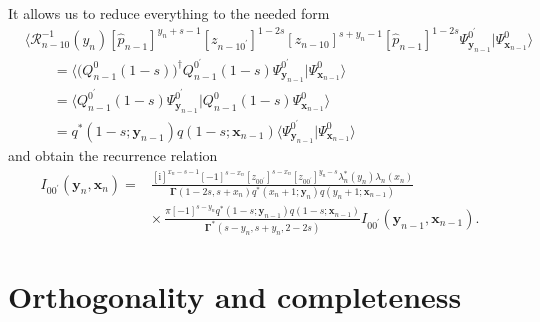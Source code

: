 \documentclass[pdftex]{sigma}
\renewcommand{\imath}{\mathrm{i}}
\numberwithin{equation}{section}
\begin{document}
It allows us to reduce everything to the needed form
\begin{align*}
&
\bigl\langle \mathcal{R}^{-1}_{n-1 0}(y_n)
[\hat{p}_{n-1}]^{y_n+s-1}
[z_{n-1 0^{\prime}}]^{1-2s} [z_{n-1 0}]^{s+y_n-1}
 [\hat{p}_{n-1}]^{1-2s} \Psi^{0^{\prime}}_{\bm{y}_{n-1}}|
\Psi^{0}_{\bm{x}_{n-1}}\bigr\rangle \\
& \qquad =
\bigl\langle
\bigl(Q^{0}_{n-1}(1-s)\bigr)^{\dagger}
Q^{0^{\prime}}_{n-1}(1-s)
 \Psi^{0^{\prime}}_{\bm{y}_{n-1}}|
\Psi^{0}_{\bm{x}_{n-1}}\bigr\rangle \\
& \qquad =
\bigl\langle
Q^{0^{\prime}}_{n-1}(1-s)
 \Psi^{0^{\prime}}_{\bm{y}_{n-1}}|
Q^{0}_{n-1}(1-s) \Psi^{0}_{\bm{x}_{n-1}}\bigr\rangle \\
& \qquad =
q^*(1-s;\bm{y}_{n-1}) q(1-s;\bm{x}_{n-1})
\bigl\langle
\Psi^{0^{\prime}}_{\bm{y}_{n-1}}|
\Psi^{0}_{\bm{x}_{n-1}}\bigr\rangle
\end{align*}
and obtain the recurrence relation
\begin{align*}
I_{0 0^{\prime}}(\bm{y}_n,\bm{x}_{n}) ={}&
\frac{[\imath]^{x_n-s-1} [-1]^{s-x_n} [z_{0 0^{\prime}}]^{s-x_n}
[z_{0 0^{\prime}}]^{y_n-s} \lambda_n^\ast(y_n) \lambda_n(x_n)}
{\mathbf{\Gamma}(1-2s,s+x_n) q^{*}(x_n+1;\bm{y}_n) q(y_n+1;\bm{x}_{n-1})} \\
& {\times}\,
\frac{\pi [-1]^{s-y_n} q^*(1-s;\bm{y}_{n-1})
q(1-s;\bm{x}_{n-1})}{\mathbf{\Gamma}^{*}(s-y_n,s+y_n,2-2s)}
I_{0 0^{\prime}}(\bm{y}_{n-1},\bm{x}_{n-1}) .
\end{align*}

\section{Orthogonality and completeness}
\label{sect:Ort}
\end{document}
